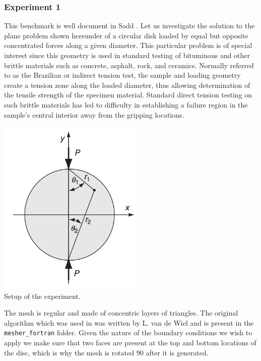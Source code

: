 \subsubsection*{Experiment 1}

This benchmark is well document in Sadd \cite{sadd14}.
Let us investigate the solution to the plane problem shown hereunder of a circular disk 
loaded by equal but opposite concentrated forces along a given diameter. 
This particular problem is of special interest since this geometry is used 
in standard testing of bituminous and other brittle materials such as 
concrete, asphalt, rock, and ceramics. Normally referred to as the Brazilian or indirect tension test, 
the sample and loading geometry create a tension zone along the loaded diameter, 
thus allowing determination of the tensile strength of the specimen material. 
Standard direct tension testing on such brittle materials has led to difficulty 
in establishing a failure region in the sample’s central interior away from 
the gripping locations.

\begin{center}
\includegraphics[width=7cm]{python_codes/fieldstone_58/experiment1/setup}\\
{\captionfont Setup of the experiment.}
\end{center}

The mesh is regular and made of concentric layers of triangles. The original algorithm
which was used in \elefant was written by L. van de Wiel and is present in the {\tt mesher\_fortran} folder.  
Given the nature of the boundary 
conditions we wish to apply we make sure that two faces are present at the top and bottom 
locations of the disc, which is why the mesh is rotated 90\degree 
after it is generated.  

